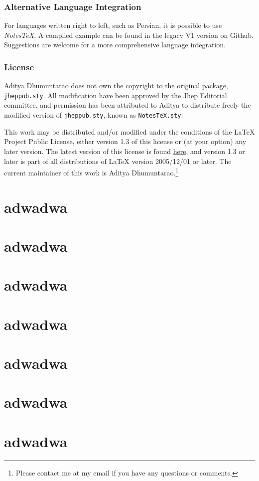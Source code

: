 \documentclass[10pt]{article}
\begin{document}
	\section{Alternative Language Integration}
	For languages written right to left, such as Persian, it is possible to use \textit{NotesTeX}. A complied example can be found in the legacy V1 version on Github. Suggestions are welcome for a more comprehensive language integration.

\section{License}\label{sec:license}
	Aditya Dhumuntarao does not own the copyright to the original package, \texttt{jheppub.sty}. All modification have been approved by the Jhep Editorial committee, and permission has been attributed to Aditya to distribute freely the modified version of \texttt{jheppub.sty}, known as \texttt{NotesTeX.sty}.

	This work may be distributed and/or modified under the conditions of the LaTeX Project Public License, either version 1.3 of this license or (at your option) any later version. The latest version of this license is found \href{http://www.latex-project.org/lppl.txt}{here}, and version 1.3 or later is part of all distributions of LaTeX version 2005/12/01 or later. The current maintainer of this work is Aditya Dhumuntarao.\footnote{Please contact me at my email if you have any questions or comments.}

	\part{adwadwa}
	\part{adwadwa}
	\part{adwadwa}
	\part{adwadwa}
	\part{adwadwa}
	\part{adwadwa}
	\part{adwadwa}
\end{document}
